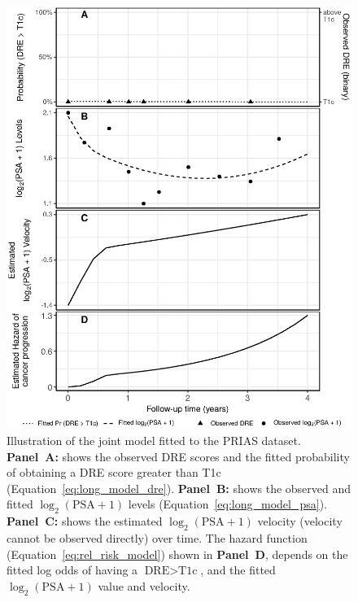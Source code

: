 \begin{figure}[!htb]
\captionsetup{justification=justified}
\centerline{\includegraphics[width=\columnwidth]{images/jmExplanationPlot_1757.eps}}
\caption{Illustration of the joint model fitted to the PRIAS dataset. \textbf{Panel~A:} shows the observed DRE scores and the fitted probability of obtaining a DRE score greater than T1c (Equation~\ref{eq:long_model_dre}). \textbf{Panel~B:} shows the observed and fitted $\log_2(\mbox{PSA} + 1)$ levels (Equation~\ref{eq:long_model_psa}). \textbf{Panel~C:} shows the estimated $\log_2(\mbox{PSA} + 1)$ velocity (velocity cannot be observed directly) over time. The hazard function (Equation~\ref{eq:rel_risk_model}) shown in \textbf{Panel~D}, depends on the fitted log odds of having a $\mbox{DRE} > \mbox{T1c}$, and the fitted $\log_2(\mbox{PSA} + 1)$ value and velocity.}
\label{fig:jmExplanationPlot_1757}
\end{figure}


